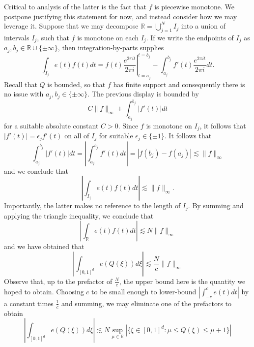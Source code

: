 \documentclass[12pt]{article}
\newcommand{\R}{\mathbb{R}}
\theoremstyle{definition}
\theoremstyle{remark}
\numberwithin{equation}{section}
\begin{document}
Critical to analysis of the latter is the fact that $f$ is piecewise monotone. We postpone justifying this statement for now, and instead consider how we may leverage it. Suppose that we may decompose $\R=\bigcup_{j=1}^N I_j$ into a union of intervals $I_j$, such that $f$ is monotone on each $I_j$. If we write the endpoints of $I_j$ as $a_j,b_j\in\R\cup\{\pm\infty\}$, then integration-by-parts supplies
\begin{equation*}
    \int_{I_j}e(t)f(t)dt=\left.f(t)\frac{e^{2\pi it}}{2\pi i}\right|_{t=a_j}^{t=b_j}-\int_{a_j}^{b_j}f'(t)\frac{e^{2\pi it}}{2\pi i}dt.
\end{equation*}
Recall that $Q$ is bounded, so that $f$ has finite support and consequently there is no issue with $a_j,b_j\in\{\pm \infty\}$. The previous display is bounded by
\begin{equation*}
    C\|f\|_\infty+\int_{a_j}^{b_j}|f'(t)|dt
\end{equation*}
for a suitable absolute constant $C>0$. Since $f$ is monotone on $I_j$, it follows that $|f'(t)|=\epsilon_j f'(t)$ on all of $I_j$ for suitable $\epsilon_j\in\{\pm 1\}$. It follows that
\begin{equation*}
    \int_{a_j}^{b_j}|f'(t)|dt=\left|\int_{a_j}^{b_j}f'(t)dt\right|=|f(b_j)-f(a_j)|\lesssim \|f\|_\infty
\end{equation*}
and we conclude that
\begin{equation*}
    \left|\int_{I_j}e(t)f(t)dt\right|\lesssim\|f\|_\infty.
\end{equation*}
Importantly, the latter makes no reference to the length of $I_j$. By summing and applying the triangle inequality, we conclude that
\begin{equation*}
    \left|\int_\R e(t)f(t)dt\right|\lesssim N\|f\|_\infty
\end{equation*}
and we have obtained that
\begin{equation*}
    \left|\int_{[0,1]^d}e(Q(\xi))d\xi\right|\lesssim\frac{N}{c}\|f\|_\infty
\end{equation*}
Observe that, up to the prefactor of $\frac{N}{c}$, the upper bound here is the quantity we hoped to obtain. Choosing $c$ to be small enough to lower-bound $\left|\int_{-c}^ce(t)dt\right|$ by a constant times $\frac{1}{c}$ and summing, we may eliminate one of the prefactors to obtain
\begin{equation*}
    \left|\int_{[0,1]^d}e(Q(\xi))d\xi\right|\lesssim N\sup_{\mu\in\R}|\{\xi\in[0,1]^d:\mu\leq Q(\xi)\leq\mu+1\}|
\end{equation*}
\fi
\end{document}
